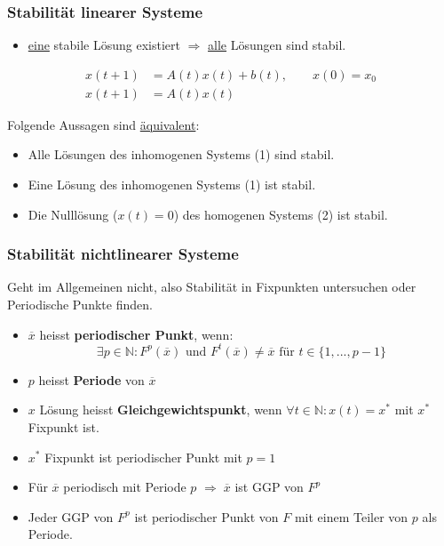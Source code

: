 \documentclass[a4paper]{article}
\begin{document}
\subsubsection{Stabilität linearer Systeme}

\begin{itemize}
	\item \underline{eine} stabile Lösung existiert $\Rightarrow$ \underline{alle}
		Lösungen sind stabil.
\end{itemize}
\begin{align}
	x(t+1) &= A(t) x(t) + b(t), \qquad x(0) = x_0 \\
	x(t+1) &= A(t) x(t)
\end{align}

Folgende Aussagen sind \underline{äquivalent}:

\begin{itemize}
	\item Alle Lösungen des inhomogenen Systems (1) sind stabil.
	\item Eine Lösung des inhomogenen Systems (1) ist stabil.
	\item Die Nulllösung ($x(t) = 0$) des homogenen Systems (2) ist stabil.
\end{itemize}

\subsubsection{Stabilität nichtlinearer Systeme}
Geht im Allgemeinen nicht, also
Stabilität in Fixpunkten untersuchen oder
Periodische Punkte finden.

\begin{itemize}
	\item $\overline{x}$ heisst \textbf{periodischer Punkt}, wenn:
		\[
		\exists p \in \mathbb{N}:
		F ^{p} (\overline{x})
		\text{ und }
		F ^{t} (\overline{x}) \neq \overline{x}
		\text{ für } t \in \{
			1, ..., p-1
		\} 
		\] 
	\item $p$ heisst \textbf{Periode}  von $\overline{x}$
	\item $x$ Lösung heisst \textbf{Gleichgewichtspunkt}, wenn
		$\forall t \in \mathbb{N}: x(t) = x ^{*}$
		mit $x ^{*}$ Fixpunkt ist.
	\item $x ^{*}$ Fixpunkt ist periodischer Punkt mit $p = 1$
	\item Für $\overline{x}$ periodisch mit Periode $p$
		$\Rightarrow \; \overline{x}$ ist GGP von $F ^{p}$
	\item Jeder GGP von $F ^{p}$ ist periodischer Punkt von $F$ mit
		einem Teiler von $p$ als Periode.
\end{itemize}
\end{document}
